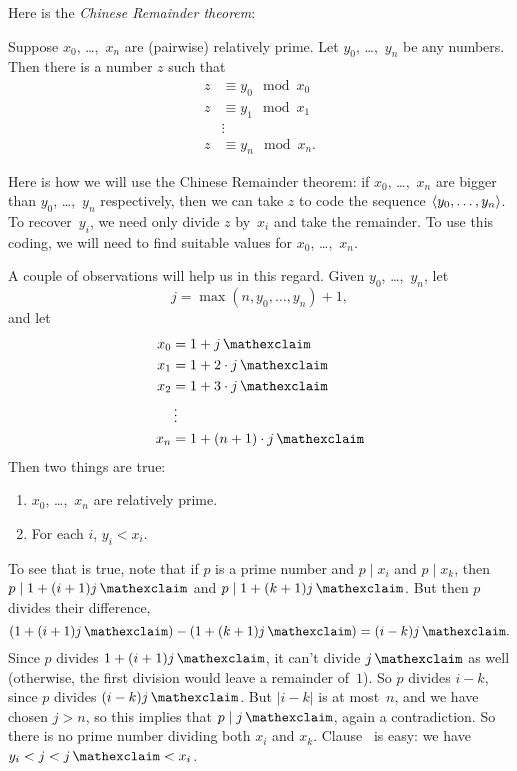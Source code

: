 \documentclass[../../../include/open-logic-section]{subfiles}
\begin{document}
Here is the \emph{Chinese Remainder theorem}:
\begin{thm}
Suppose $x_0$, \dots,~$x_n$ are (pairwise) relatively prime. Let
$y_0$, \dots,~$y_n$ be any numbers. Then there is a number $z$ such that
\begin{align*}
z & \equiv y_0 \mod x_0 \\
z & \equiv y_1 \mod x_1 \\
& \vdots  \\
z & \equiv y_n \mod x_n.
\end{align*}
\end{thm}

Here is how we will use the Chinese Remainder theorem: if $x_0$,
\dots,~$x_n$ are bigger than $y_0$, \dots,~$y_n$ respectively, then we
can take $z$ to code the sequence $\langle y_0, \dots,y_n \rangle$. To
recover~$y_i$, we need only divide $z$ by~$x_i$ and take the
remainder. To use this coding, we will need to find suitable values
for $x_0$, \dots,~$x_n$.

A couple of observations will help us in this regard. Given
$y_0$, \dots,~$y_n$, let
\[
j = \max(n, y_0, \dots, y_n) + 1,
\]
and let
\begin{align*}
x_0 & = 1 + \fact{j} \\
x_1 & = 1 + 2 \cdot \fact{j} \\
x_2 & = 1 + 3 \cdot \fact{j} \\
& \vdots  \\
x_n & = 1 + (n+1) \cdot \fact{j}
\end{align*}
Then two things are true:
\begin{enumerate}
\item{} $x_0$, \dots,~$x_n$ are relatively prime.
\item{} For each $i$, $y_i < x_i$.
\end{enumerate}
To see that  is true, note that if $p$ is a prime number and $p
\mid x_i$ and $p \mid x_k$, then $p \mid 1 + (i+1) \fact{j}$ and $p \mid
1 + (k+1) \fact{j}$. But then $p$ divides their difference,
\[
(1 + (i+1)\fact{j}) - (1+ (k+1)\fact{j}) = (i-k) \fact{j}.
\]
Since $p$ divides $1 + (i+1)\fact{j}$, it can't divide $\fact{j}$ as well
(otherwise, the first division would leave a remainder of~$1$). So $p$
divides $i-k$, since $p$ divides $(i-k)\fact{j}$. But $\left| i-k
\right|$ is at most~$n$, and we have chosen $j > n$, so this implies
that $p \mid \fact{j}$, again a contradiction. So there is no prime
number dividing both $x_i$ and $x_k$. Clause~ is easy: we have $y_i <
j < \fact{j} < x_i$.
\end{document}
